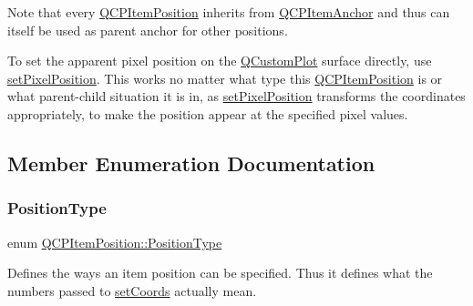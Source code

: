 Note that every \hyperlink{classQCPItemPosition}{Q\+C\+P\+Item\+Position} inherits from \hyperlink{classQCPItemAnchor}{Q\+C\+P\+Item\+Anchor} and thus can itself be used as parent anchor for other positions.

To set the apparent pixel position on the \hyperlink{classQCustomPlot}{Q\+Custom\+Plot} surface directly, use \hyperlink{classQCPItemPosition_a8d4f858f2089973967cf9cb81970ef0a}{set\+Pixel\+Position}. This works no matter what type this \hyperlink{classQCPItemPosition}{Q\+C\+P\+Item\+Position} is or what parent-\/child situation it is in, as \hyperlink{classQCPItemPosition_a8d4f858f2089973967cf9cb81970ef0a}{set\+Pixel\+Position} transforms the coordinates appropriately, to make the position appear at the specified pixel values. 

\subsection{Member Enumeration Documentation}
\mbox{\label{classQCPItemPosition_aad9936c22bf43e3d358552f6e86dbdc8}} 
\subsubsection{\texorpdfstring{Position\+Type}{PositionType}}
{\footnotesize\ttfamily enum \hyperlink{classQCPItemPosition_aad9936c22bf43e3d358552f6e86dbdc8}{Q\+C\+P\+Item\+Position\+::\+Position\+Type}}

Defines the ways an item position can be specified. Thus it defines what the numbers passed to \hyperlink{classQCPItemPosition_aa988ba4e87ab684c9021017dcaba945f}{set\+Coords} actually mean.


